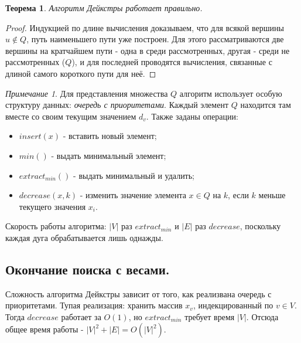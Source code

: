 \documentclass[a4paper]{article}
\theoremstyle{indented}
\newtheorem{theorem}{Теорема}
\theoremstyle{definition}
\theoremstyle{remark}
\newtheorem{remark}{Примечание}
\begin{document}
\begin{theorem}
    Алгоритм Дейкстры работает правильно.
\end{theorem}

\begin{proof}
    Индукцией по длине вычисления доказываем, что для всякой вершины $u\notin Q$, путь наименьшего пути уже построен. Для этого рассматриваются две вершины на кратчайшем пути - одна в среди рассмотренных, другая - среди не рассмотренных ($Q$), и для последней проводятся вычисления, связанные с длиной самого короткого пути для неё.
\end{proof}

\begin{remark}
    Для представления множества $Q$ алгоритм использует особую структуру данных: \textit{очередь с приоритетами}. Каждый элемент $Q$ находится там вместе со своим текущим значением $d_v$. Также заданы операции: 

    \begin{itemize}
        \item $insert(x)$ - вставить новый элемент; 
        \item $min()$ - выдать минимальный элемент; 
        \item $extract_{min}()$ - выдать минимальный и удалить; 
        \item $decrease(x, k)$ - изменить значение элемента $x\in Q$ на $k$, если $k$ меньше текущего значения $x_i$. 
    \end{itemize}

    Скорость работы алгоритма: $|V|$ раз $extract_{min}$ и $|E|$ раз $decrease$, поскольку каждая дуга обрабатывается лишь однажды. 
\end{remark}

\subsection{Окончание поиска с весами.}

Сложность алгоритма Дейкстры зависит от того, как реализвана очередь с приоритетами. Тупая реализация: хранить массив $x_v$, индекцированный по $v\in V$. Тогда $decrease$ работает за $O(1)$, но $extract_{min}$ требует время $|V|$. Отсюда общее время работы - $|V|^2+|E|=O(|V|^2)$. \\
\end{document}

